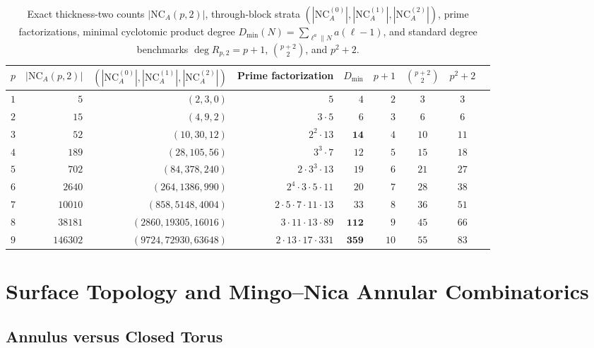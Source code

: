 \documentclass[11pt,a4paper]{article}
\theoremstyle{definition}
\theoremstyle{remark}
\newcommand{\NCA}{\mathrm{NC}_A}
\begin{document}
\begin{enumerate}
\end{enumerate}

\begin{table}[ht]
\centering
\small
\caption{Exact thickness-two counts $|\NCA(p,2)|$, through-block strata $(|\NCA^{(0)}|, |\NCA^{(1)}|, |\NCA^{(2)}|)$, prime factorizations, minimal cyclotomic product degree $D_{\min}(N) = \sum_{\ell^a \parallel N} a(\ell-1)$, and standard degree benchmarks $\deg R_{p,2} = p+1$, $\binom{p+2}{2}$, and $p^2+2$.}
\label{tab:counts}
\begin{tabular}{@{}rrrrrrccc@{}}
\toprule
$p$ & $|\NCA(p,2)|$ & $(|\NCA^{(0)}|,|\NCA^{(1)}|,|\NCA^{(2)}|)$ & Prime factorization & $D_{\min}$ & $p+1$ & $\binom{p+2}{2}$ & $p^2+2$ \\
\midrule
$1$ & $5$ & $(2, 3, 0)$ & $5$ & $4$ & $2$ & $3$ & $3$ \\
$2$ & $15$ & $(4, 9, 2)$ & $3 \cdot 5$ & $6$ & $3$ & $6$ & $6$ \\
$3$ & $52$ & $(10, 30, 12)$ & $2^2 \cdot 13$ & $\mathbf{14}$ & $4$ & $10$ & $11$ \\
$4$ & $189$ & $(28, 105, 56)$ & $3^3 \cdot 7$ & $12$ & $5$ & $15$ & $18$ \\
$5$ & $702$ & $(84, 378, 240)$ & $2 \cdot 3^3 \cdot 13$ & $19$ & $6$ & $21$ & $27$ \\
$6$ & $2640$ & $(264, 1386, 990)$ & $2^4 \cdot 3 \cdot 5 \cdot 11$ & $20$ & $7$ & $28$ & $38$ \\
$7$ & $10010$ & $(858, 5148, 4004)$ & $2 \cdot 5 \cdot 7 \cdot 11 \cdot 13$ & $33$ & $8$ & $36$ & $51$ \\
$8$ & $38181$ & $(2860, 19305, 16016)$ & $3 \cdot 11 \cdot 13 \cdot 89$ & $\mathbf{112}$ & $9$ & $45$ & $66$ \\
$9$ & $146302$ & $(9724, 72930, 63648)$ & $2 \cdot 13 \cdot 17 \cdot 331$ & $\mathbf{359}$ & $10$ & $55$ & $83$ \\
\bottomrule
\end{tabular}
\end{table}

\section{Surface Topology and Mingo--Nica Annular Combinatorics}

\subsection{Annulus versus Closed Torus}
\end{document}
